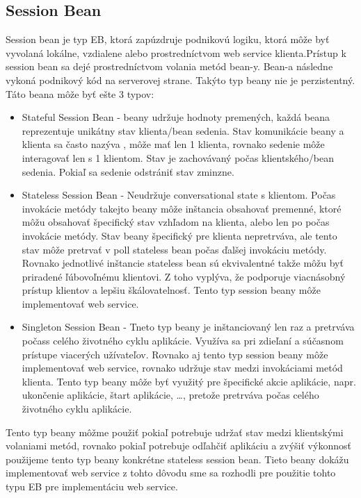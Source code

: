 \subsection{Session Bean}
Session bean je typ EB, ktorá zapúzdruje podnikovú logiku, ktorá môže byť vyvolaná lokálne, vzdialene alebo prostredníctvom web service klienta.Prístup k session bean sa dejé prostredníctvom volania metód bean-y. Bean-a následne vykoná podnikový kód na serverovej strane. Takýto typ beany nie je perzistentný. Táto beana môže byť ešte 3 typov:
\begin{itemize}
\item Stateful Session Bean - beany udržuje hodnoty premených, každá beana reprezentuje unikátny stav klienta/bean sedenia. Stav komunikácie beany a klienta sa často nazýva , môže mať len 1 klienta, rovnako sedenie môže interagovať len s 1 klientom. Stav je zachovávaný počas klientského/bean sedenia. Pokiaľ sa sedenie odstrániť stav zminzne.
\item Stateless Session Bean - Neudržuje conversational state s klientom. Počas invokácie metódy takejto beany môže inštancia obsahovať premenné, ktoré môžu obsahovať špecifický stav vzhľadom na klienta, alebo len po počas invokácie metódy. Stav beany špecifický pre klienta nepretrváva, ale tento stav môže pretrvať v poll stateless bean počas ďalšej invokáciu metódy. Rovnako jednotlivé inštancie stateless bean sú ekvivalentné takže môžu byť priradené ľúbovoľnému klientovi. Z toho vyplýva, že podporuje viacnásobný prístup klientov a lepšiu škálovatelnosť. Tento typ session beany môže implementovať web service.
\item Singleton Session Bean - Tneto typ beany je inštanciovaný len raz a pretrváva počass celého životného cyklu aplikácie. Využíva sa pri zdieľaní a súčasnom prístupe viacerých užívateľov. Rovnako aj tento typ session beany môže implementovať web service, rovnako udržuje stav medzi invokáciami metód klienta. Tento typ beany môže byť využitý pre špecifické akcie aplikácie, napr. ukončenie aplikácie, štart aplikácie, \ldots, pretože pretrváva počas celého životného cyklu aplikácie.
\end{itemize}

Tento typ beany môžme použiť pokiaľ potrebuje udržať stav medzi klientskými volaniami metód, rovnako pokiaľ potrebuje odľahčiť aplikáciu a zvýšiť výkonnosť použijeme tento typ beany konkrétne stateless session bean. Tieto beany dokážu implementovať web service z tohto dôvodu sme sa rozhodli pre použitie tohto typu EB pre implementáciu web service.

